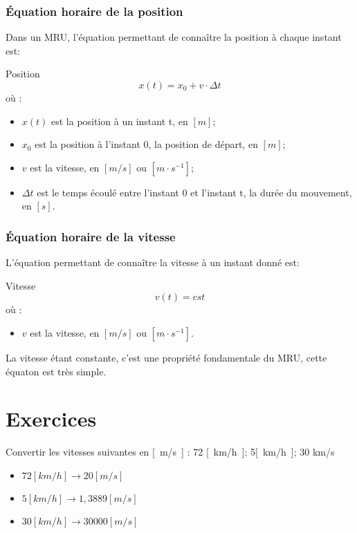 \subsubsection{Équation horaire de la position}
Dans un MRU, l'équation permettant de connaître la position à chaque instant est:
\begin{mytheo*}{Position}
    \begin{equation}
        x(t)=x_0+v \cdot \Delta t
    \end{equation}
    où :
    \begin{itemize}[label=\textbullet]
        \item \(x(t)\) est la position à un instant t, en \(\unit{[m]}\);
        \item \(x_0\) est la position à l'instant 0, la position de départ, en \(\unit{[m]}\);
        \item \(v\) est la vitesse, en \(\unit{[m/s]}\) ou \(\unit{[m \cdot s^{-1}]}\);
        \item \(\Delta t\) est le temps écoulé entre l'instant 0 et l'instant t, la durée du mouvement, en \([s]\).
    \end{itemize}
\end{mytheo*}

\subsubsection{Équation horaire de la vitesse}
L'équation permettant de connaître la vitesse à un instant donné est:
\begin{mytheo*}{Vitesse}
    \begin{equation}
        v(t)=cst
    \end{equation}
    où :
    \begin{itemize}[label= \textbullet]
        \item \(v\) est la vitesse, en \(\unit{[m/s]}\) ou \(\unit{[m \cdot s^{-1}]}\).
    \end{itemize}
\end{mytheo*}
La vitesse étant constante, c'est une propriété fondamentale du MRU, cette équaton est très simple.

\newpage

\section{Exercices}
\begin{exercise}
    Convertir les vitesses suivantes en \unit{[m/s]} : 72 \unit{[km/h]}; 5\unit{[km/h]}; 30 km/s
\end{exercise}
\begin{solution}
    \begin{itemize}
        \item \(72[km/h] \rightarrow 20[m/s]\)
        \item \(5[km/h] \rightarrow 1,3889[m/s]\)
        \item \(30[km/h] \rightarrow 30000[m/s]\)
    \end{itemize}

\end{solution}

